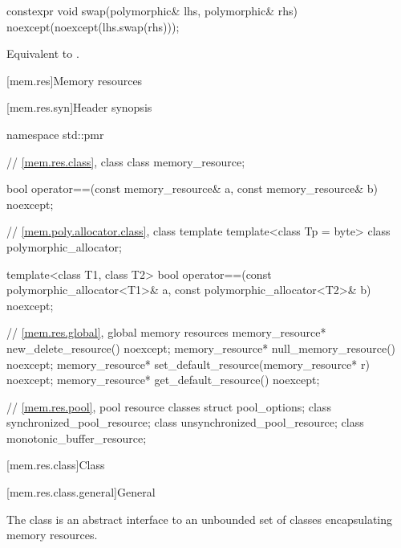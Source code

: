 %
\begin{itemdecl}
constexpr void swap(polymorphic& lhs, polymorphic& rhs) noexcept(noexcept(lhs.swap(rhs)));
\end{itemdecl}

\begin{itemdescr}
\pnum
\effects
Equivalent to .
\end{itemdescr}

[mem.res]{Memory resources}

[mem.res.syn]{Header  synopsis}

%
\begin{codeblock}
namespace std::pmr {
  // \ref{mem.res.class}, class 
  class memory_resource;

  bool operator==(const memory_resource& a, const memory_resource& b) noexcept;

  // \ref{mem.poly.allocator.class}, class template 
  template<class Tp = byte> class polymorphic_allocator;

  template<class T1, class T2>
    bool operator==(const polymorphic_allocator<T1>& a,
                    const polymorphic_allocator<T2>& b) noexcept;

  // \ref{mem.res.global}, global memory resources
  memory_resource* new_delete_resource() noexcept;
  memory_resource* null_memory_resource() noexcept;
  memory_resource* set_default_resource(memory_resource* r) noexcept;
  memory_resource* get_default_resource() noexcept;

  // \ref{mem.res.pool}, pool resource classes
  struct pool_options;
  class synchronized_pool_resource;
  class unsynchronized_pool_resource;
  class monotonic_buffer_resource;
}
\end{codeblock}

[mem.res.class]{Class }

[mem.res.class.general]{General}

\pnum
The  class is an abstract interface to an unbounded set of classes encapsulating memory resources.

